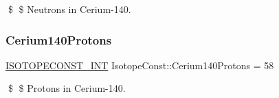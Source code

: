\$ \$ Neutrons in Cerium-\/140. \mbox{\label{group___isotope_const-_cerium-_ce140_gaabab04b80a93e19c12ee48479a5eb996}} 
\subsubsection{\texorpdfstring{Cerium140\+Protons}{Cerium140Protons}}
{\footnotesize\ttfamily \mbox{\hyperlink{group___isotope_const-_macros_ga5f18360b3e99483a35c32d789e62621c}{I\+S\+O\+T\+O\+P\+E\+C\+O\+N\+S\+T\+\_\+\+I\+NT}} Isotope\+Const\+::\+Cerium140\+Protons = 58}

\$ \$ Protons in Cerium-\/140. 